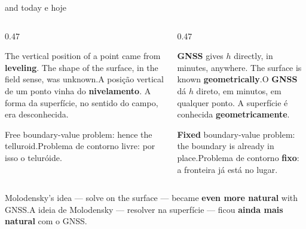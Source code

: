 \documentclass[aspectratio=169,11pt]{beamer}
\newcommand{\tr}[2]{\ifEN#2\else#1\fi}
\newcommand{\bnum}[1]{\textbf{\textcolor{mTeal}{#1}}}
\begin{document}
\begin{frame}{\tr{1945 e hoje}{1945 and today}}
  \begin{columns}[T]
    \begin{column}{0.47\textwidth}
      \begin{cuidado}[title={1945}]
        \tr{A posição vertical de um ponto vinha do \bnum{nivelamento}. A forma da superfície,
        no sentido do campo, era desconhecida.}{The vertical position of a point came from
        \bnum{leveling}. The shape of the surface, in the field sense, was unknown.}
        \medskip

        \tr{Problema de contorno \alert{livre}: por isso o teluróide.}{\alert{Free}
        boundary-value problem: hence the telluroid.}
      \end{cuidado}
    \end{column}
    \begin{column}{0.47\textwidth}
      \begin{regra}[title={\tr{Hoje}{Today}}]
        \tr{O \bnum{GNSS} dá $h$ direto, em minutos, em qualquer ponto. A superfície é
        conhecida \bnum{geometricamente}.}{\bnum{GNSS} gives $h$ directly, in minutes,
        anywhere. The surface is known \bnum{geometrically}.}
        \medskip

        \tr{Problema de contorno \bnum{fixo}: a fronteira já está no lugar.}{\bnum{Fixed}
        boundary-value problem: the boundary is already in place.}
      \end{regra}
    \end{column}
  \end{columns}
  \bigskip
  \centering
  \tr{A ideia de Molodensky --- resolver na superfície --- ficou \bnum{ainda mais natural}
  com o GNSS.}{Molodensky's idea --- solve on the surface --- became \bnum{even more natural}
  with GNSS.}
\end{frame}
\end{document}
